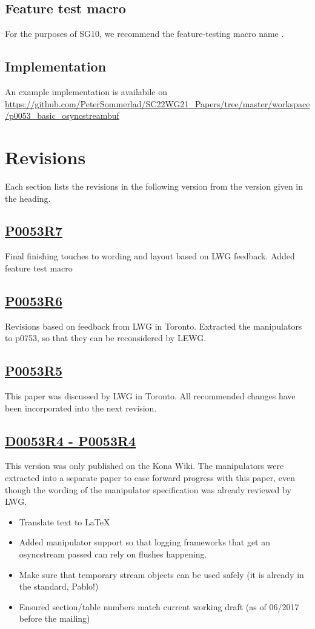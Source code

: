 \documentclass[ebook,11pt,article]{memoir}
\begin{document}
\section {Feature test macro}
For the purposes of SG10, we recommend the feature-testing macro name .

\section{Implementation}
An example implementation is availabile on \url{https://github.com/PeterSommerlad/SC22WG21_Papers/tree/master/workspace/p0053_basic_osyncstreambuf}

\chapter{Revisions}
Each section lists the revisions in the following version from the version given in the heading.

\section{\href{https://wg21.link/P0053R7}{P0053R7}}
Final finishing touches to wording and layout based on LWG feedback. Added feature test macro

\section{\href{https://wg21.link/P0053R6}{P0053R6}}
Revisions based on feedback from LWG in Toronto. Extracted the manipulators to p0753, so that they can be reconsidered by LEWG. 

\section{\href{https://wg21.link/P0053R5}{P0053R5}}
This paper was discussed by LWG in Toronto. All recommended changes have been incorporated into the next revision.
\section{\href{http://wiki.edg.com/pub/Wg21kona2017/LibraryEvolutionWorkingGroup/p0053r4.html}{D0053R4 - P0053R4}}
This version was only published on the Kona Wiki. The manipulators were extracted into a separate paper to ease forward progress with this paper, even though the wording of the manipulator specification was already reviewed by LWG.
\begin{itemize}
\item Translate text to LaTeX
\item Added manipulator support so that logging frameworks that get an osyncstream passed can rely on flushes happening.
\item Make sure that temporary stream objects can be used safely (it is already in the standard, Pablo!)
\item Ensured section/table numbers match current working draft (as of 06/2017 before the mailing)
\end{itemize}
\end{document}
